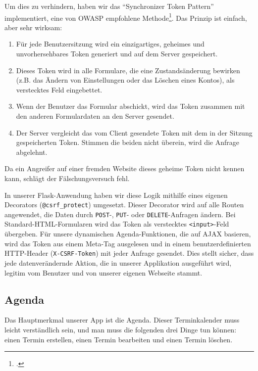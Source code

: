 \documentclass[12pt,a4paper]{report}
\begin{document}
Um dies zu verhindern, haben wir das \enquote{Synchronizer Token Pattern} implementiert, eine von OWASP empfohlene Methode\footcite{OWASP_CSRF}. Das Prinzip ist einfach, aber sehr wirksam:
\begin{enumerate}
    \item Für jede Benutzersitzung wird ein einzigartiges, geheimes und unvorhersehbares Token generiert und auf dem Server gespeichert.
    \item Dieses Token wird in alle Formulare, die eine Zustandsänderung bewirken (z.B. das Ändern von Einstellungen oder das Löschen eines Kontos), als verstecktes Feld eingebettet.
    \item Wenn der Benutzer das Formular abschickt, wird das Token zusammen mit den anderen Formulardaten an den Server gesendet.
    \item Der Server vergleicht das vom Client gesendete Token mit dem in der Sitzung gespeicherten Token. Stimmen die beiden nicht überein, wird die Anfrage abgelehnt.
\end{enumerate}
Da ein Angreifer auf einer fremden Website dieses geheime Token nicht kennen kann, schlägt der Fälschungsversuch fehl.

In unserer Flask-Anwendung haben wir diese Logik mithilfe eines eigenen Decorators (\texttt{@csrf\_protect}) umgesetzt. Dieser Decorator wird auf alle Routen angewendet, die Daten durch \texttt{POST}-, \texttt{PUT}- oder \texttt{DELETE}-Anfragen ändern. Bei Standard-HTML-Formularen wird das Token als verstecktes \texttt{<input>}-Feld übergeben. Für unsere dynamischen Agenda-Funktionen, die auf AJAX basieren, wird das Token aus einem Meta-Tag ausgelesen und in einem benutzerdefinierten HTTP-Header (\texttt{X-CSRF-Token}) mit jeder Anfrage gesendet. Dies stellt sicher, dass jede datenverändernde Aktion, die in unserer Applikation ausgeführt wird, legitim vom Benutzer und von unserer eigenen Webseite stammt.


\subsection{Agenda}
Das Hauptmerkmal unserer App ist die Agenda. Dieser Terminkalender muss leicht verständlich sein, und man muss die folgenden drei Dinge tun können: einen Termin erstellen, einen Termin bearbeiten und einen Termin löschen.
\end{document}
